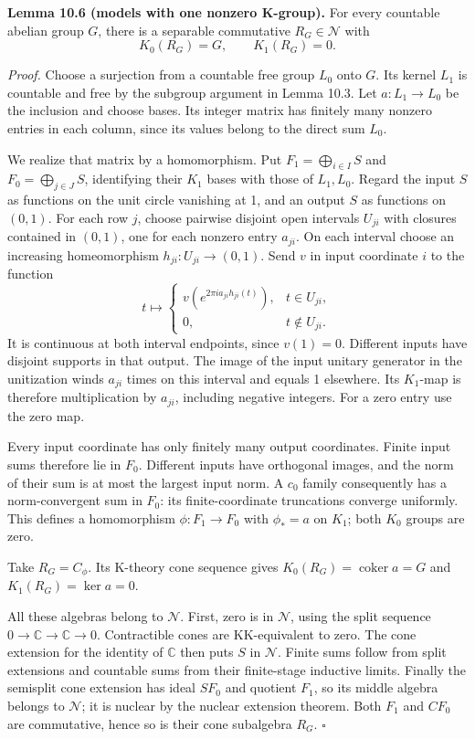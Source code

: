 \documentclass[
  11pt,
]{article}
\begin{document}
\textbf{Lemma 10.6 (models with one nonzero K-group).} For every
countable abelian group \(G\), there is a separable commutative
\(R_G\in\mathcal N\) with \[
K_0(R_G)=G,\qquad K_1(R_G)=0.
\tag{10.14}
\]

\emph{Proof.} Choose a surjection from a countable free group \(L_0\)
onto \(G\). Its kernel \(L_1\) is countable and free by the subgroup
argument in Lemma 10.3. Let \(a:L_1\to L_0\) be the inclusion and choose
bases. Its integer matrix has finitely many nonzero entries in each
column, since its values belong to the direct sum \(L_0\).

We realize that matrix by a homomorphism. Put
\(F_1=\bigoplus_{i\in I}S\) and \(F_0=\bigoplus_{j\in J}S\), identifying
their \(K_1\) bases with those of \(L_1,L_0\). Regard the input \(S\) as
functions on the unit circle vanishing at 1, and an output \(S\) as
functions on \((0,1)\). For each row \(j\), choose pairwise disjoint
open intervals \(U_{ji}\) with closures contained in \((0,1)\), one for
each nonzero entry \(a_{ji}\). On each interval choose an increasing
homeomorphism \(h_{ji}:U_{ji}\to(0,1)\). Send \(v\) in input coordinate
\(i\) to the function \[
t\longmapsto
\begin{cases}
v(e^{2\pi i a_{ji}h_{ji}(t)}),&t\in U_{ji},\\
0,&t\notin U_{ji}.
\end{cases}
\tag{10.15}
\] It is continuous at both interval endpoints, since \(v(1)=0\).
Different inputs have disjoint supports in that output. The image of the
input unitary generator in the unitization winds \(a_{ji}\) times on
this interval and equals 1 elsewhere. Its \(K_1\)-map is therefore
multiplication by \(a_{ji}\), including negative integers. For a zero
entry use the zero map.

Every input coordinate has only finitely many output coordinates. Finite
input sums therefore lie in \(F_0\). Different inputs have orthogonal
images, and the norm of their sum is at most the largest input norm. A
\(c_0\) family consequently has a norm-convergent sum in \(F_0\): its
finite-coordinate truncations converge uniformly. This defines a
homomorphism \(\phi:F_1\to F_0\) with \(\phi_*=a\) on \(K_1\); both
\(K_0\) groups are zero.

Take \(R_G=C_\phi\). Its K-theory cone sequence gives
\(K_0(R_G)=\operatorname{coker}a=G\) and \(K_1(R_G)=\ker a=0\).

All these algebras belong to \(\mathcal N\). First, zero is in
\(\mathcal N\), using the split sequence
\(0\to\mathbb C\to\mathbb C\to0\). Contractible cones are KK-equivalent
to zero. The cone extension for the identity of \(\mathbb C\) then puts
\(S\) in \(\mathcal N\). Finite sums follow from split extensions and
countable sums from their finite-stage inductive limits. Finally the
semisplit cone extension has ideal \(SF_0\) and quotient \(F_1\), so its
middle algebra belongs to \(\mathcal N\); it is nuclear by the nuclear
extension theorem. Both \(F_1\) and \(CF_0\) are commutative, hence so
is their cone subalgebra \(R_G\). \(\square\)
\end{document}
